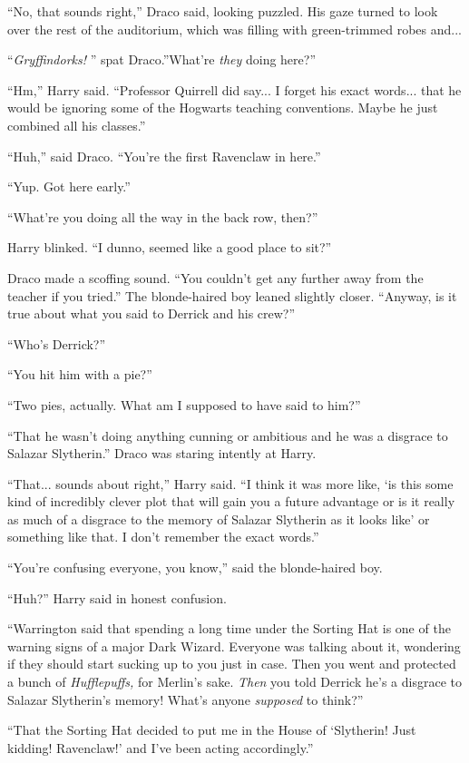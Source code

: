 ``No, that sounds right,'' Draco said, looking puzzled. His gaze turned
to look over the rest of the auditorium, which was filling with
green-trimmed robes and...

``\emph{Gryffindorks!} '' spat Draco.''What're \emph{they} doing here?''

``Hm,'' Harry said. ``Professor Quirrell did say... I forget his
exact words... that he would be ignoring some of the Hogwarts
teaching conventions. Maybe he just combined all his classes.''

``Huh,'' said Draco. ``You're the first Ravenclaw in here.''

``Yup. Got here early.''

``What're you doing all the way in the back row, then?''

Harry blinked. ``I dunno, seemed like a good place to sit?''

Draco made a scoffing sound. ``You couldn't get any further away from
the teacher if you tried.'' The blonde-haired boy leaned slightly
closer. ``Anyway, is it true about what you said to Derrick and his
crew?''

``Who's Derrick?''

``You hit him with a pie?''

``Two pies, actually. What am I supposed to have said to him?''

``That he wasn't doing anything cunning or ambitious and he was a
disgrace to Salazar Slytherin.'' Draco was staring intently at Harry.

``That... sounds about right,'' Harry said. ``I think it was more
like, `is this some kind of incredibly clever plot that will gain you a
future advantage or is it really as much of a disgrace to the memory of
Salazar Slytherin as it looks like' or something like that. I don't
remember the exact words.''

``You're confusing everyone, you know,'' said the blonde-haired boy.

``Huh?'' Harry said in honest confusion.

``Warrington said that spending a long time under the Sorting Hat is one
of the warning signs of a major Dark Wizard. Everyone was talking about
it, wondering if they should start sucking up to you just in case. Then
you went and protected a bunch of \emph{Hufflepuffs,} for Merlin's sake.
\emph{Then} you told Derrick he's a disgrace to Salazar Slytherin's
memory! What's anyone \emph{supposed} to think?''

``That the Sorting Hat decided to put me in the House of `Slytherin!
Just kidding! Ravenclaw!' and I've been acting accordingly.''

